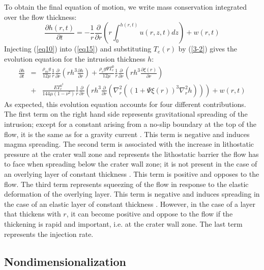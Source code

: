 \begin{article}
To obtain  the final  equation of motion,  we write  mass conservation
integrated over the flow thickness:
\begin{equation}
  \frac{\partial h(r,t)}{\partial t} = -\frac{1}{r} \frac{\partial}{\partial r} \left( r \int_{0}^{h(r,t)} u(r,z,t) dz\right ) + w(r,t) 
  \label{eq15}
\end{equation}
Injecting (\ref{eq10})  into (\ref{eq15}) and  substituting $T_{e}(r)$
by  (\ref{3-2})  gives  the   evolution  equation  for  the  intrusion
thickness $h$:
\begin{eqnarray}
  \frac{\partial h}{\partial t} &=&\frac{\rho_{m}g}{12 \mu} \frac{1}{r} \frac{\partial}{\partial r}\left (r h^{3} \frac{\partial h}{\partial r} \right)+ \frac{\rho_{c}g\Psi T_{e}^0}{12 \mu} \frac{1}{r} \frac{\partial}{\partial r}\left ( r h^{3} \frac{\partial \xi(r)}{\partial r}\right ) \nonumber \\
                                &+&\frac{E T_{e}^{0^{3}}}{144\mu (1-\nu^{2})}\frac{1}{r}\frac{\partial}{\partial r}\left ( r h^{3} \frac{\partial}{\partial r} \left(\nabla^{2}_{r} ((1+\Psi \xi(r))^{3}\nabla^{2}_{r}h )\right)\right )+ w(r,t) 
                                    \label{eq16}
\end{eqnarray}
As  expected,  this evolution  equation  accounts  for four  different
contributions.  The  first term  on  the  right hand  side  represents
gravitational  spreading  of  the  intrusion; except  for  a  constant
arising from a no-slip boundary at the top of the flow, it is the same
as for  a gravity current  \citep{Huppert1982}. This term  is negative
and induces  magma spreading. The  second term is associated  with the
increase  in  lithostatic  pressure  at   the  crater  wall  zone  and
represents the lithostatic barrier the flow has to face when spreading
below  the crater  wall zone;  it is  not present  in the  case of  an
overlying layer  of constant thickness \citep{Michaut2011}.  This term
is  positive  and opposes  to  the  flow.  The third  term  represents
squeezing of  the flow in response  to the elastic deformation  of the
overlying layer.  This term is  negative and induces spreading  in the
case    of     an    elastic     layer    of     constant    thickness
\citep{Michaut2011}. However,  in the  case of  a layer  that thickens
with  $r$, it  can  become positive  and  oppose to  the  flow if  the
thickening is rapid  and important, i.e. at the crater  wall zone. The
last term represents the injection rate.

\subsection{Nondimensionalization}
\label{Dimensionless_Equation}


\end{article}
